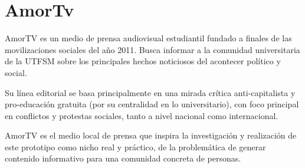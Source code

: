 \section{AmorTv}

AmorTV \cite{amorTV} es un medio de prensa audiovisual estudiantil fundado a finales de las movilizaciones sociales del año 2011. Busca informar a la comunidad universitaria de la UTFSM sobre los principales hechos noticiosos del acontecer político y social. 

Su línea editorial se basa principalmente en una mirada crítica anti-capitalista y pro-educación gratuita (por su centralidad en lo universitario), con foco principal en conflictos y protestas sociales, tanto a nivel nacional como internacional.

AmorTV es el medio local de prensa que inspira la investigación y realización de este prototipo como nicho real y práctico, de la problemática de generar contenido informativo para una comunidad concreta de personas.